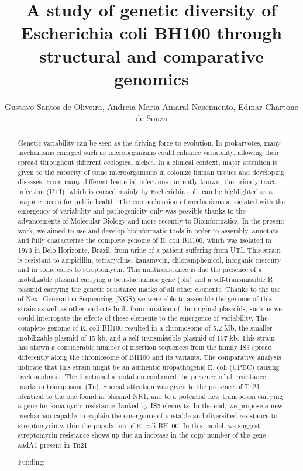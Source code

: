 \documentclass[twoside]{article}
\title{\vspace{-15mm}\fontsize{24pt}{10pt}\selectfont\textbf{ A study of genetic diversity of Escherichia coli BH100 through structural and comparative genomics }} %
\author{ Gustavo Santos de Oliveira, Andreia Maria Amaral Nascimento, Edmar Chartone de Souza }
\affil{  }
\date{}
\begin{document}
  
  
  \maketitle %
  
  
  \thispagestyle{fancy} %
  
  
  \begin{abstract}
  Genetic variability can be seen as the driving force to evolution. In prokaryotes,  many mechanisms emerged such as microorganisms could enhance variability,  allowing their spread throughout different ecological niches. In a clinical context,  major attention is given to the capacity of some microorganisms in colonize human tissues and developing diseases. From many different bacterial infections currently known,  the urinary tract infection (UTI),  which is caused mainly by Escherichia coli,  can be highlighted as a major concern for public health. The comprehension of mechanisms associated with the emergency of variability and pathogenicity only was possible thanks to the advancements of Molecular Biology and more recently to Bioinformatics. In the present work,  we aimed to use and develop bioinformatic tools in order to assembly,  annotate and fully characterize the complete genome of E. coli BH100,  which was isolated in 1973 in Belo Horizonte,  Brazil,  from urine of a patient suffering from UTI. This strain is resistant to ampicillin,  tetracycline,  kanamycin,  chloramphenicol,  inorganic mercury and in some cases to streptomycin. This multiresistance is due the presence of a mobilizable plasmid carrying a beta-lactamase gene (bla) and a self-transmissible R plasmid carrying the genetic resistance marks of all other elements. Thanks to the use of Next Generation Sequencing (NGS) we were able to assemble the genome of this strain as well as other variants built from curation of the original plasmids,  such as we could interrogate the effects of these elements to the emergence of variability. The complete genome of E. coli BH100 resulted in a chromosome of \~ 5.2 Mb,  the smaller mobilizable plasmid of \~15 kb,  and a self-transmissible plasmid of \~107 kb. This strain has shown a considerable number of insertion sequences from the family IS3 spread differently along the chromosome of BH100 and its variants. The comparative analysis indicate that this strain might be an authentic uropathogenic E. coli (UPEC) causing pyelonephritis. The functional annotation confirmed the presence  of all resistance marks in transposons (Tn). Special attention was given to the presence of Tn21,  identical to the one found in plasmid NR1,  and to a potential new transposon carrying a gene for kanamycin resistance flanked by IS5 elements. In the end,  we propose a new mechanism capable to explain the emergence of unstable and diversified resistance to streptomycin within the population of E. coli BH100. In this model,  we suggest streptomycin resistance shows up due an increase in the copy number of the gene aadA1 present in Tn21
  
  Funding:  \\ 
  \end{abstract}
  
\end{document}
